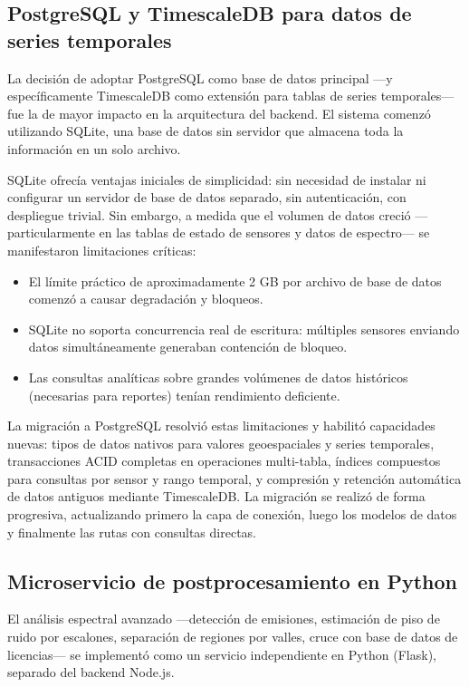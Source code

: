 \subsection{PostgreSQL y TimescaleDB para datos de series temporales}

La decisión de adoptar PostgreSQL como base de datos principal —y
específicamente TimescaleDB como extensión para tablas de series temporales—
fue la de mayor impacto en la arquitectura del backend. El sistema comenzó
utilizando SQLite, una base de datos sin servidor que almacena toda la
información en un solo archivo.

SQLite ofrecía ventajas iniciales de simplicidad: sin necesidad de instalar
ni configurar un servidor de base de datos separado, sin autenticación, con
despliegue trivial. Sin embargo, a medida que el volumen de datos creció
—particularmente en las tablas de estado de sensores y datos de espectro— se
manifestaron limitaciones críticas:

\begin{itemize}
    \item El límite práctico de aproximadamente 2 GB por archivo de base de
    datos comenzó a causar degradación y bloqueos.
    \item SQLite no soporta concurrencia real de escritura: múltiples
    sensores enviando datos simultáneamente generaban contención de bloqueo.
    \item Las consultas analíticas sobre grandes volúmenes de datos
    históricos (necesarias para reportes) tenían rendimiento deficiente.
\end{itemize}

La migración a PostgreSQL resolvió estas limitaciones y habilitó capacidades
nuevas: tipos de datos nativos para valores geoespaciales y series temporales,
transacciones ACID completas en operaciones multi-tabla, índices compuestos
para consultas por sensor y rango temporal, y compresión y retención
automática de datos antiguos mediante TimescaleDB. La migración se realizó de
forma progresiva, actualizando primero la capa de conexión, luego los modelos
de datos y finalmente las rutas con consultas directas.

\subsection{Microservicio de postprocesamiento en Python}

El análisis espectral avanzado —detección de emisiones, estimación de piso de
ruido por escalones, separación de regiones por valles, cruce con base de
datos de licencias— se implementó como un servicio independiente en Python
(Flask), separado del backend Node.js.


